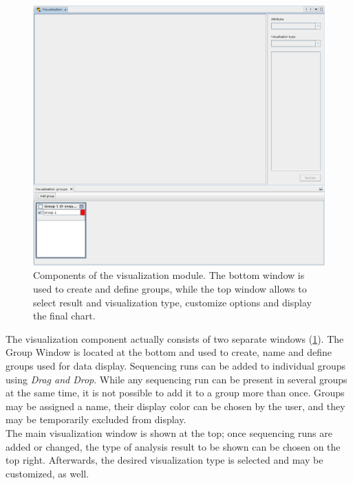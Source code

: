 \begin{figure}[H]
\centering
\includegraphics[width=.8\textwidth]{img/mgx/VizComponent}
\caption[Visualization components]{Components of the visualization module. The bottom window is
used to create and define groups, while the top window allows to select result and visualization
type, customize options and display the final chart.}
\label{viz2}
\end{figure}

The visualization component actually consists of two separate windows (\ref{viz2}). The Group
Window is located at the bottom and used to create, name and define groups used for data display.
Sequencing runs can be added to individual groups using \textit{Drag and Drop}. While any
sequencing run can be present in several groups at the same time, it is not possible to add
it to a group more than once. Groups may be assigned a name, their display color can be chosen
by the user, and they may be temporarily excluded from display.\\
The main visualization window is shown at the top; once sequencing runs are added or changed, 
the type of analysis result to be shown can be chosen on the top right. Afterwards, the desired
visualization type is selected and may be customized, as well.

